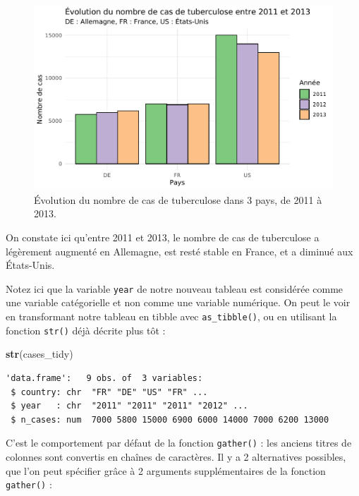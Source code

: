 \documentclass[a4paperpaper,]{article}
\newenvironment{Shaded}{\begin{snugshade}}{\end{snugshade}}
\newcommand{\KeywordTok}[1]{\textcolor[rgb]{0.12,0.11,0.11}{\textbf{#1}}}
\newcommand{\NormalTok}[1]{\textcolor[rgb]{0.12,0.11,0.11}{#1}}
\theoremstyle{definition}
\theoremstyle{definition}
\theoremstyle{definition}
\theoremstyle{remark}
\begin{document}
\begin{figure}[htpb]

{\centering \includegraphics[width=0.9\linewidth]{figure/casesbarplot-1} 

}

\caption{Évolution du nombre de cas de tuberculose dans 3 pays, de 2011 à 2013.}\label{fig:casesbarplot}
\end{figure}

On constate ici qu'entre 2011 et 2013, le nombre de cas de tuberculose a
légèrement augmenté en Allemagne, est resté stable en France, et a
diminué aux États-Unis.

Notez ici que la variable \texttt{year} de notre nouveau tableau est
considérée comme une variable catégorielle et non comme une variable
numérique. On peut le voir en transformant notre tableau en tibble avec
\texttt{as\_tibble()}, ou en utilisant la fonction \texttt{str()} déjà
décrite plus tôt :

\begin{Shaded}
\begin{Highlighting}[]
\KeywordTok{str}\NormalTok{(cases_tidy)}
\end{Highlighting}
\end{Shaded}

\begin{verbatim}
'data.frame':   9 obs. of  3 variables:
 $ country: chr  "FR" "DE" "US" "FR" ...
 $ year   : chr  "2011" "2011" "2011" "2012" ...
 $ n_cases: num  7000 5800 15000 6900 6000 14000 7000 6200 13000
\end{verbatim}

C'est le comportement par défaut de la fonction \texttt{gather()} : les
anciens titres de colonnes sont convertis en chaînes de caractères. Il y
a 2 alternatives possibles, que l'on peut spécifier grâce à 2 arguments
supplémentaires de la fonction \texttt{gather()} :
\end{document}
